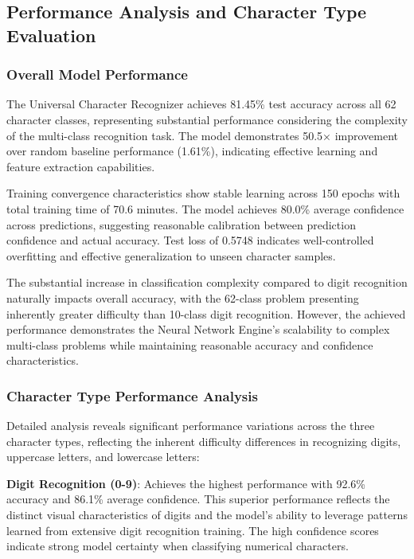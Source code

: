 \documentclass[11pt,a4paper]{report}
\begin{document}
\subsection{Performance Analysis and Character Type Evaluation}

\subsubsection{Overall Model Performance}

The Universal Character Recognizer achieves 81.45\% test accuracy across all 62 character classes, representing substantial performance considering the complexity of the multi-class recognition task. The model demonstrates 50.5× improvement over random baseline performance (1.61\%), indicating effective learning and feature extraction capabilities.

Training convergence characteristics show stable learning across 150 epochs with total training time of 70.6 minutes. The model achieves 80.0\% average confidence across predictions, suggesting reasonable calibration between prediction confidence and actual accuracy. Test loss of 0.5748 indicates well-controlled overfitting and effective generalization to unseen character samples.

The substantial increase in classification complexity compared to digit recognition naturally impacts overall accuracy, with the 62-class problem presenting inherently greater difficulty than 10-class digit recognition. However, the achieved performance demonstrates the Neural Network Engine's scalability to complex multi-class problems while maintaining reasonable accuracy and confidence characteristics.

\subsubsection{Character Type Performance Analysis}

Detailed analysis reveals significant performance variations across the three character types, reflecting the inherent difficulty differences in recognizing digits, uppercase letters, and lowercase letters:

\textbf{Digit Recognition (0-9)}: Achieves the highest performance with 92.6\% accuracy and 86.1\% average confidence. This superior performance reflects the distinct visual characteristics of digits and the model's ability to leverage patterns learned from extensive digit recognition training. The high confidence scores indicate strong model certainty when classifying numerical characters.
\end{document}
